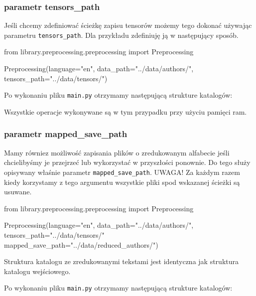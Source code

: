 \newpage
\subsubsection{parametr tensors\_path}
Jeśli chcemy zdefiniować ścieżkę zapisu tensorów możemy tego dokonać używając parametru 
\texttt{tensors\_path}. Dla przykładu zdefiniuję ją w następujący sposób. 
\begin{python}
from library.preprocessing.preprocessing import Preprocessing

Preprocessing(language="en",
              data_path="../data/authors/",
              tensors_path="../data/tensors/")
                   
\end{python}

Po wykonaniu pliku \texttt{main.py} otrzymamy następującą strukture katalogów:
\myspace
{}
\myspace

Wszystkie operacje wykonywane są w tym przypadku przy użyciu pamięci ram.


\subsubsection{parametr mapped\_save\_path}
Mamy równiez możliwość zapisania plików o zredukowanym alfabecie jeśli chcielibyśmy je przejrzeć lub
wykorzystać w przyszłości ponownie. Do tego służy opisywany właśnie parametr \texttt{mapped\_save\_path}.
UWAGA! Za każdym razem kiedy korzystamy z tego argumentu wszystkie pliki spod wskazanej ścieżki są 
usuwane.

\begin{python}
from library.preprocessing.preprocessing import Preprocessing

Preprocessing(language="en",
              data_path="../data/authors/",
              tensors_path="../data/tensors/"
              mapped_save_path="../data/reduced_authors/")
                   
\end{python}
Struktura katalogu ze zredukowanymi tekstami jest identyczna jak struktura katalogu wejściowego. 

Po wykonaniu pliku \texttt{main.py} otrzymamy następującą strukture katalogów:

\myspace
{}
\myspace

